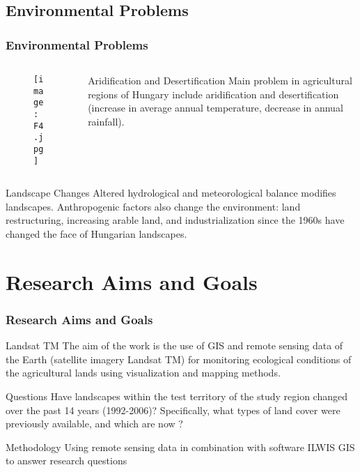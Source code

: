 \documentclass[pdflatex,compress,10pt,
	xcolor={dvipsnames,dvipsnames,svgnames,x11names,table},
	hyperref={
	breaklinks = true, 
	pdfauthor={Lemenkova Polina}, 
	pdfsubject={Preentation}, 
	pdfcreator={Lemenkova Polina}, 
	pdfproducer={Lemenkova Polina}, 
	citecolor=NavyBlue, 
	urlcolor = NavyBlue, 
	breaklinks = true}]{beamer}
\begin{document}
\subsection{Environmental Problems}
\begin{frame}\frametitle{Environmental Problems}
\begin{minipage}[0.4\textheight]{\textwidth}
\begin{columns}[T]
\begin{column}{0.5\textwidth}
\begin{figure}[H]
	\centering
		\texttt{[image: F4.jpg]}
\end{figure}
\end{column}
\begin{column}{0.5\textwidth}

\begin{alertblock}{Aridification and Desertification}
Main problem in agricultural regions of Hungary include aridification and desertification\\
 (increase in average annual temperature, decrease in annual rainfall).
\end{alertblock}

\end{column}
\end{columns}
\end{minipage}

\begin{block}{Landscape Changes}
Altered hydrological and meteorological balance modifies landscapes. Anthropogenic factors also change the environment: land restructuring, increasing arable land, and industrialization since the 1960s have changed the face of Hungarian landscapes.
\end{block}

\end{frame}

\section{Research Aims and Goals}
\begin{frame}\frametitle{Research Aims and Goals}

\begin{alertblock}{Landsat TM}
The aim of the work is the use of GIS and remote sensing data of the Earth (satellite imagery Landsat TM) for monitoring ecological conditions of the agricultural lands using visualization and mapping methods.
\end{alertblock}

\begin{block}{Questions}
Have landscapes within the test territory of the study region changed over the past 14 years (1992-2006)?
Specifically, what types of land cover were previously available, and which are now ?
\end{block}

\begin{block}{Methodology}
Using remote sensing data in combination with software ILWIS GIS to answer research questions
\end{block}
\end{frame}
\end{document}
